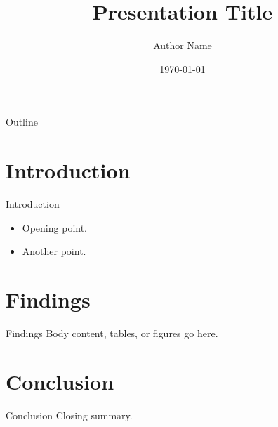 \documentclass[11pt]{beamer}
\title{Presentation Title}
\author{Author Name}
\date{\today}
\begin{document}
\begin{frame}
\titlepage
\end{frame}

\begin{frame}{Outline}
\tableofcontents
\end{frame}

\section{Introduction}
\begin{frame}{Introduction}
\begin{itemize}
\item Opening point.
\item Another point.
\end{itemize}
\end{frame}

\section{Findings}
\begin{frame}{Findings}
Body content, tables, or figures go here.
\end{frame}

\section{Conclusion}
\begin{frame}{Conclusion}
Closing summary.
\end{frame}
\end{document}
